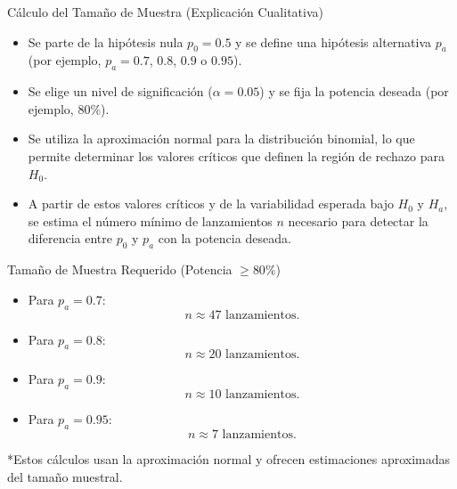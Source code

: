 ﻿\documentclass{beamer}
\begin{document}
\begin{frame}{Cálculo del Tamaño de Muestra (Explicación Cualitativa)}
    \begin{itemize}
        \item Se parte de la hipótesis nula \(p_0=0.5\) y se define una hipótesis alternativa \(p_a\) (por ejemplo, \(p_a=0.7\), \(0.8\), \(0.9\) o \(0.95\)).
        \item Se elige un nivel de significación (\(\alpha=0.05\)) y se fija la potencia deseada (por ejemplo, 80\%).
        \item Se utiliza la aproximación normal para la distribución binomial, lo que permite determinar los valores críticos que definen la región de rechazo para \(H_0\).
        \item A partir de estos valores críticos y de la variabilidad esperada bajo \(H_0\) y \(H_a\), se estima el número mínimo de lanzamientos \(n\) necesario para detectar la diferencia entre \(p_0\) y \(p_a\) con la potencia deseada.
    \end{itemize}
\end{frame}


\begin{frame}{Tamaño de Muestra Requerido (Potencia $\geq 80\%$)}
    \begin{itemize}
        \item Para \(p_a=0.7\):
        \[
        n \approx 47 \text{ lanzamientos.}
        \]
        \item Para \(p_a=0.8\):
        \[
        n \approx 20 \text{ lanzamientos.}
        \]
        \item Para \(p_a=0.9\):
        \[
        n \approx 10 \text{ lanzamientos.}
        \]
        \item Para \(p_a=0.95\):
        \[
        n \approx 7 \text{ lanzamientos.}
        \]
    \end{itemize}
    \vspace{0.3cm}
    \footnotesize{*Estos cálculos usan la aproximación normal y ofrecen estimaciones aproximadas del tamaño muestral.}
\end{frame}
\end{document}
